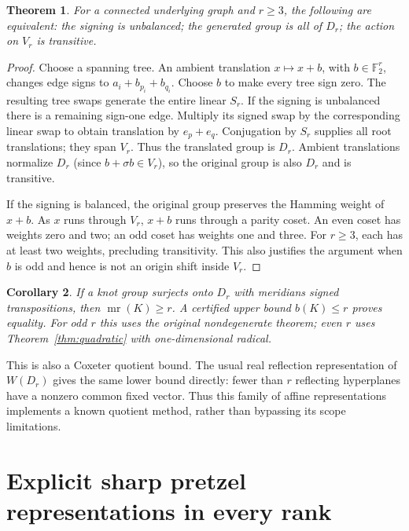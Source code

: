 \documentclass[11pt]{article}
\newtheorem{theorem}{Theorem}
\newtheorem{corollary}[theorem]{Corollary}
\newcommand{\F}{\mathbb F}
\newcommand{\mr}{\operatorname{mr}}
\begin{document}
\begin{theorem}\label{thm:signedgraph}
For a connected underlying graph and $r\ge3$, the following are equivalent:
the signing is unbalanced; the generated group is all of $D_r$; the action
on $V_r$ is transitive.
\end{theorem}
\begin{proof}
Choose a spanning tree. An ambient translation $x\mapsto x+b$, with
$b\in\F_2^r$, changes edge signs to $a_i+b_{p_i}+b_{q_i}$.
Choose $b$ to make every tree sign zero. The resulting tree swaps generate
the entire linear $S_r$. If the signing is unbalanced there is a remaining
sign-one edge. Multiply its signed swap by the corresponding linear swap
to obtain translation by $e_p+e_q$. Conjugation by $S_r$ supplies all
root translations; they span $V_r$. Thus the translated group is $D_r$.
Ambient translations normalize $D_r$ (since $b+\sigma b\in V_r$), so the
original group is also $D_r$ and is transitive.

If the signing is balanced, the original group preserves the Hamming
weight of $x+b$. As $x$ runs through $V_r$, $x+b$ runs through a parity
coset. An even coset has weights zero and two; an odd coset has weights
one and three. For $r\ge3$, each has at least two weights, precluding
transitivity. This also justifies the argument when $b$ is odd and hence
is not an origin shift inside $V_r$.
\end{proof}

\begin{corollary}
If a knot group surjects onto $D_r$ with meridians signed transpositions,
then $\mr(K)\ge r$. A certified upper bound $b(K)\le r$ proves equality.
For odd $r$ this uses the original nondegenerate theorem; even $r$ uses
Theorem~\ref{thm:quadratic} with one-dimensional radical.
\end{corollary}

This is also a Coxeter quotient bound. The usual real reflection
representation of $W(D_r)$ gives the same lower bound directly: fewer
than $r$ reflecting hyperplanes have a nonzero common fixed vector.
Thus this family of affine representations implements a known quotient
method, rather than bypassing its scope limitations.

\section{Explicit sharp pretzel representations in every rank}
\end{document}
